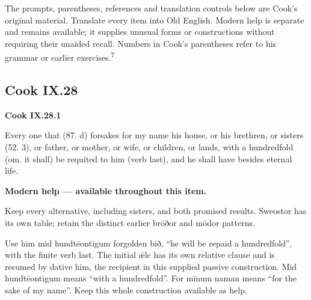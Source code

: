 The prompts, parentheses, references and translation controls below are Cook’s original material. Translate every item into Old English. Modern help is separate and remains available; it supplies unusual forms or constructions without requiring their unaided recall. Numbers in Cook’s parentheses refer to his grammar or earlier exercises.\textsuperscript{7}

\subsection*{Cook IX.28}

\par\begin{minipage}{\linewidth}\raggedright
\textbf{Cook IX.28.1}

Every one that (87. d) forsakes for my name his house, or his brethren, or sisters (52. 3), or father, or mother, or wife, or children, or lands, with a hundredfold (om. it shall) be requited to him (verb last), and he shall have besides eternal life.

\textbf{Modern help — available throughout this item.}

\end{minipage}\par\addvspace{4pt}

Keep every alternative, including sisters, and both promised results. Sweostor has its own table; retain the distinct earlier brōðor and mōdor patterns.

Use him mid hundtēontigum forgolden bið, “he will be repaid a hundredfold”, with the finite verb last. The initial ǣlc has its own relative clause and is resumed by dative him, the recipient in this supplied passive construction. Mid hundtēontigum means “with a hundredfold”. For mīnum naman means “for the sake of my name”. Keep this whole construction available as help.

